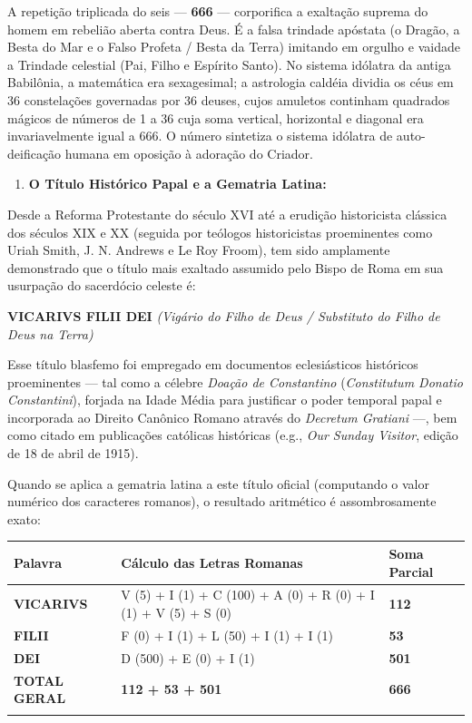 A repetição triplicada do seis — \textbf{666} — corporifica a exaltação suprema do homem em rebelião aberta contra Deus. É a falsa trindade apóstata (o Dragão, a Besta do Mar e o Falso Profeta / Besta da Terra) imitando em orgulho e vaidade a Trindade celestial (Pai, Filho e Espírito Santo). No sistema idólatra da antiga Babilônia, a matemática era sexagesimal; a astrologia caldéia dividia os céus em 36 constelações governadas por 36 deuses, cujos amuletos continham quadrados mágicos de números de 1 a 36 cuja soma vertical, horizontal e diagonal era invariavelmente igual a 666. O número sintetiza o sistema idólatra de auto-deificação humana em oposição à adoração do Criador.

\begin{enumerate}
  \item \textbf{O Título Histórico Papal e a Gematria Latina:}
\end{enumerate}

Desde a Reforma Protestante do século XVI até a erudição historicista clássica dos séculos XIX e XX (seguida por teólogos historicistas proeminentes como Uriah Smith, J. N. Andrews e Le Roy Froom), tem sido amplamente demonstrado que o título mais exaltado assumido pelo Bispo de Roma em sua usurpação do sacerdócio celeste é:

\textbf{VICARIVS FILII DEI}
\textit{(Vigário do Filho de Deus / Substituto do Filho de Deus na Terra)}

Esse título blasfemo foi empregado em documentos eclesiásticos históricos proeminentes — tal como a célebre \textit{Doação de Constantino} (\textit{Constitutum Donatio Constantini}), forjada na Idade Média para justificar o poder temporal papal e incorporada ao Direito Canônico Romano através do \textit{Decretum Gratiani} —, bem como citado em publicações católicas históricas (e.g., \textit{Our Sunday Visitor}, edição de 18 de abril de 1915).

Quando se aplica a gematria latina a este título oficial (computando o valor numérico dos caracteres romanos), o resultado aritmético é assombrosamente exato:


\begin{table}[htbp]
\centering
\footnotesize
\setlength{\tabcolsep}{5pt}
\renewcommand{\arraystretch}{1.25}
\begin{tabularx}{\textwidth}{>{\raggedright\arraybackslash}p{} >{\raggedright\arraybackslash}X >{\raggedright\arraybackslash}X}
\toprule
\textbf{Palavra} & \textbf{Cálculo das Letras Romanas} & \textbf{Soma Parcial} \\
\midrule
\textbf{VICARIVS} & V (5) + I (1) + C (100) + A (0) + R (0) + I (1) + V (5) + S (0) & \textbf{112} \\
\addlinespace[3pt]
\textbf{FILII} & F (0) + I (1) + L (50) + I (1) + I (1) & \textbf{53} \\
\addlinespace[3pt]
\textbf{DEI} & D (500) + E (0) + I (1) & \textbf{501} \\
\addlinespace[3pt]
\textbf{TOTAL GERAL} & \textbf{112 + 53 + 501} & \textbf{666} \\
\addlinespace[3pt]
\bottomrule
\end{tabularx}
\end{table}


